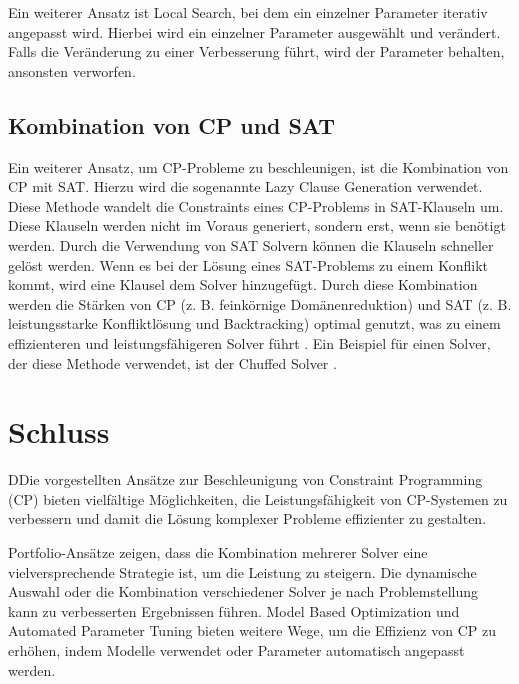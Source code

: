 Ein weiterer Ansatz ist Local Search, bei dem ein einzelner Parameter iterativ
angepasst wird. Hierbei wird ein einzelner Parameter ausgewählt und verändert.
Falls die Veränderung zu einer Verbesserung führt, wird der Parameter behalten,
ansonsten verworfen.


  
\subsection{Kombination von CP und SAT}
\label{sec:Kombination-von-CP-und-SAT}

Ein weiterer Ansatz, um CP-Probleme zu beschleunigen, ist die Kombination von CP
mit SAT. Hierzu wird die sogenannte Lazy Clause Generation verwendet. Diese
Methode wandelt die Constraints eines CP-Problems in SAT-Klauseln um. Diese
Klauseln werden nicht im Voraus generiert, sondern erst, wenn sie benötigt
werden. Durch die Verwendung von SAT Solvern können die Klauseln schneller
gelöst werden. Wenn es bei der Lösung eines SAT-Problems zu einem Konflikt
kommt, wird eine Klausel dem Solver hinzugefügt. Durch diese Kombination werden
die Stärken von CP (z. B. feinkörnige Domänenreduktion) und SAT (z. B.
leistungsstarke Konfliktlösung und Backtracking) optimal genutzt, was zu einem
effizienteren und leistungsfähigeren Solver führt \cite[5]{goosjo}. Ein Beispiel
für einen Solver, der diese Methode verwendet, ist der Chuffed Solver
\cite{Chuff24co}.


  

  

\section{Schluss}
\label{sec:Schluss}
DDie vorgestellten Ansätze zur Beschleunigung von Constraint Programming (CP)
bieten vielfältige Möglichkeiten, die Leistungsfähigkeit von CP-Systemen zu
verbessern und damit die Lösung komplexer Probleme effizienter zu gestalten.

Portfolio-Ansätze zeigen, dass die Kombination mehrerer Solver eine
vielversprechende Strategie ist, um die Leistung zu steigern. Die dynamische
Auswahl oder die Kombination verschiedener Solver je nach Problemstellung kann
zu verbesserten Ergebnissen führen. Model Based Optimization und Automated
Parameter Tuning bieten weitere Wege, um die Effizienz von CP zu erhöhen, indem
Modelle verwendet oder Parameter automatisch angepasst werden.


